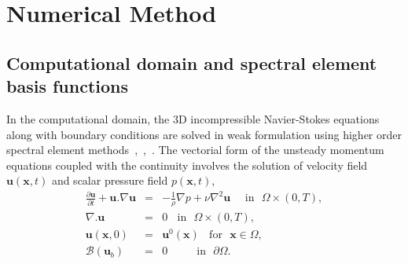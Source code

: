 \documentclass[times]{fldauth}
\begin{document}
 \section{Numerical Method}
  \label{} 
  \subsection{Computational domain and spectral element basis functions}\label{specelem}
  In the computational domain, the 3D incompressible Navier-Stokes equations along with boundary conditions are solved in weak formulation using higher order spectral element methods~\cite{patera3},~\cite{patera2},~\cite{fischer_jcp}. The vectorial form of the unsteady momentum equations coupled with the continuity involves the solution of velocity field $\mathbf{u}(\mathbf{x},t)$ and scalar pressure field $p(\mathbf{x},t)$,
  \begin{eqnarray}
\frac{\partial \mathbf{u}}{\partial t} + \mathbf{u}.\nabla \mathbf{u} & = & -\frac{1}{\rho}\nabla p + \nu \nabla^2 \mathbf{u}  \ \ \ \ \ \   \mbox{in} \ \ \ {{\Omega}} \times (0,T), \nonumber \\
\nabla.{\mathbf{u}} & = & 0 \ \ \ \ \mbox{in}\ \ \ {{\Omega}} \times (0,T), \nonumber \\
\mathbf{u}(\mathbf{x},0) &=& \mathbf{u}^{0}(\mathbf{x})\ \ \ \ \mbox{for}\ \ \ \mathbf{x}\in\Omega, \nonumber \\
\mathcal{B}(\mathbf{u}_{b}) & = & 0 \  \  \   \  \  \   \  \  \  \  \ \ \mbox{in} \ \ \ \partial {{\Omega}}. \label{NS}
\end{eqnarray}
\end{document}
